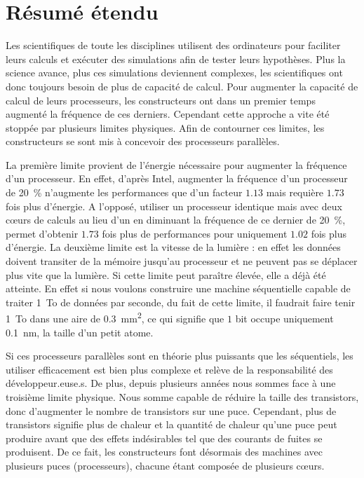 
\chapter{Résumé étendu}

Les scientifiques de toute les disciplines utilisent des ordinateurs pour faciliter leurs calculs et exécuter des simulations afin de tester leurs hypothèses.
Plus la science avance, plus ces simulations deviennent complexes, les scientifiques ont donc toujours besoin de plus de capacité de calcul.
Pour augmenter la capacité de calcul de leurs processeurs, les constructeurs ont dans un premier temps augmenté la fréquence de ces derniers.
Cependant cette approche a vite été stoppée par plusieurs limites physiques.
Afin de contourner ces limites, les constructeurs se sont mis à concevoir des processeurs parallèles.

La première limite provient de l'énergie nécessaire pour augmenter la fréquence d'un processeur.
En effet, d'après \gls{Intel}, augmenter la fréquence d'un processeur de \SI{20}{\%} n'augmente les performances que d'un facteur $1.13$ mais requière $1.73$ fois plus d'énergie.
A l'opposé, utiliser un processeur identique mais avec deux cœurs de calculs au lieu d'un en diminuant la fréquence de ce dernier de \SI{20}{\%}, permet d'obtenir $1.73$ fois plus de performances pour uniquement $1.02$ fois plus d'énergie.
La deuxième limite est la vitesse de la lumière : en effet les données doivent transiter de la mémoire jusqu'au processeur et ne peuvent pas se déplacer plus vite que la lumière.
Si cette limite peut paraître élevée, elle a déjà été atteinte.
En effet si nous voulons construire une machine séquentielle capable de traiter \SI{1}{To} de données par seconde, du fait de cette limite, il faudrait faire tenir \SI{1}{To} dans une aire de \SI{0.3}{mm^2}, ce qui signifie que $1$ bit occupe uniquement \SI{0.1}{nm}, la taille d'un petit atome.

Si ces processeurs parallèles sont en théorie plus puissants que les séquentiels, les utiliser efficacement est bien plus complexe et relève de la responsabilité des développeur.euse.s.
De plus, depuis plusieurs années nous sommes face à une troisième limite physique.
Nous somme capable de réduire la taille des transistors, donc d'augmenter le nombre de transistors sur une puce.
Cependant, plus de transistors signifie plus de chaleur et la quantité de chaleur qu'une puce peut produire avant que des effets indésirables tel que des courants de fuites se produisent.
De ce fait, les constructeurs font désormais des machines avec plusieurs puces (processeurs), chacune étant composée de plusieurs cœurs.

